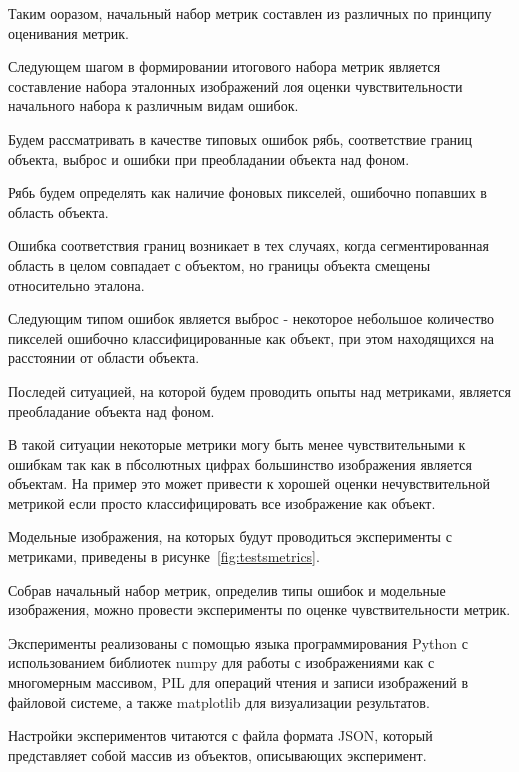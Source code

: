 Таким ооразом, начальный набор метрик составлен из различных по принципу оценивания метрик.

Следующем шагом в формировании итогового набора метрик является составление набора эталонных изображений лоя оценки чувствительности начального набора к различным видам ошибок.

Будем рассматривать в качестве типовых ошибок рябь, соответствие границ объекта, выброс и ошибки при преобладании объекта над фоном.

Рябь будем определять как наличие фоновых пикселей, ошибочно попавших в область объекта.

Ошибка соответствия границ возникает в тех случаях, когда сегментированная область в целом совпадает с объектом, но границы объекта смещены относительно эталона. 

Следующим типом ошибок является выброс - некоторое небольшое количество пикселей ошибочно классифицированные как объект, при этом находящихся на расстоянии от области объекта.

Последей ситуацией, на которой будем проводить опыты над метриками, является преобладание объекта над фоном. 

В такой ситуации некоторые метрики могу быть менее чувствительными к ошибкам так как в пбсолютных цифрах большинство изображения является объектам. На пример это может привести к хорошей оценки нечувствительной метрикой если просто классифицировать все изображение как объект.

Модельные изображения, на которых будут проводиться эксперименты с метриками, приведены в рисунке~\ref{fig:testsmetrics}.


Собрав начальный набор метрик, определив типы ошибок и модельные изображения, можно провести эксперименты по оценке чувствительности метрик.

Эксперименты реализованы с помощью языка программирования Python с использованием библиотек numpy для работы с изображениями как с многомерным массивом, PIL для операций чтения и записи изображений в файловой системе, а также matplotlib для визуализации результатов.

Настройки экспериментов читаются с файла формата JSON, который представляет собой массив из объектов, описывающих эксперимент. 

